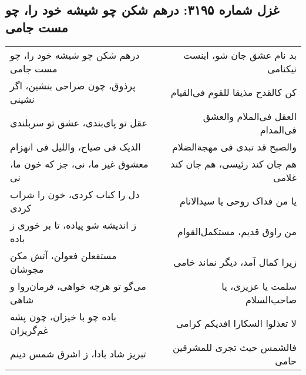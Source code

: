 \begin{center}
\section*{غزل شماره ۳۱۹۵: درهم شکن چو شیشه خود را، چو مست جامی}
\label{sec:3195}
\begin{longtable}{l p{0.5cm} r}
درهم شکن چو شیشه خود را، چو مست جامی
&&
بد نام عشق جان شو، اینست نیکنامی
\\
پرذوق، چون صراحی بنشین، اگر نشینی
&&
کن کالقدح مذیقا للقوم فی‌القیام
\\
عقل تو پای‌بندی، عشق تو سربلندی
&&
العقل فی‌الملام والعشق فی‌المدام
\\
الدیک فی صیاح، واللیل فی انهزام
&&
والصبح قد تبدی فی مهجةالضلام
\\
معشوق غیر ما، نی، جز که خون ما، نی
&&
هم جان کند رئیسی، هم جان کند غلامی
\\
دل را کباب کردی، خون را شراب کردی
&&
یا من فداک روحی یا سیدالانام
\\
ز اندیشه شو پیاده، تا بر خوری ز باده
&&
من راوق قدیم، مستکمل‌القوام
\\
مستفعلن فعولن، آتش مکن مجوشان
&&
زیرا کمال آمد، دیگر نماند خامی
\\
می‌گو تو هرچه خواهی، فرمان‌روا و شاهی
&&
سلمت یا عزیزی، یا صاحب‌السلام
\\
باده چو با خیزان، چون پشه غم‌گریزان
&&
لا تعذلوا السکارا افدیکم کرامی
\\
تبریز شاد بادا، ز اشرق شمس دینم
&&
فالشمس حیث تجری للمشرقین حامی
\\
\end{longtable}
\end{center}
